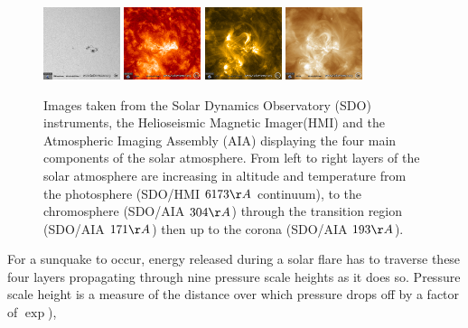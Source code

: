 \begin{figure}[H]%
  \begin{center}
  \includegraphics[width=0.20\textwidth]{2014_03_29_17_19_42_HMI_Int}%
  \includegraphics[width=0.20\textwidth]{2014_03_29_17_19_42_AIA_304}%
  \includegraphics[width=0.20\textwidth]{2014_03_29_17_19_42_AIA_171}%
  \includegraphics[width=0.20\textwidth]{2014_03_29_17_19_42_AIA_193}%
  \caption{ Images taken from the Solar Dynamics Observatory (SDO) instruments, the Helioseismic Magnetic Imager(HMI) and the Atmospheric Imaging Assembly (AIA) displaying the four main components of the solar atmosphere. From left to right layers of the solar atmosphere are increasing in altitude and temperature from the photosphere (SDO/HMI $6173\AA$ continuum), to the chromosphere (SDO/AIA $304\AA$) through the transition region (SDO/AIA $171\AA$) then up to the corona (SDO/AIA $193\AA$).}\label{solatmpics}
\end{center}
\end{figure}


For a sunquake to occur, energy released during a solar flare has to traverse these four layers propagating through nine pressure scale heights as it does so. Pressure scale height is a measure of the distance over which pressure drops off by a factor of $\exp$), 


